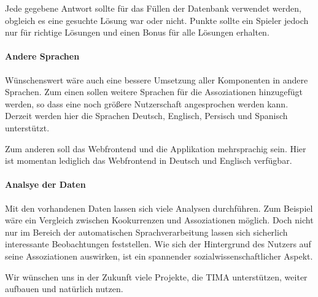 Jede gegebene Antwort sollte für das Füllen der Datenbank verwendet werden, obgleich
es eine gesuchte Lösung war oder nicht. Punkte sollte ein Spieler jedoch nur
für richtige Lösungen und einen Bonus für alle Lösungen erhalten.

\paragraph{Andere Sprachen}
Wünschenswert wäre auch eine bessere Umsetzung aller Komponenten in andere Sprachen.
Zum einen sollen weitere Sprachen für die Assoziationen hinzugefügt werden, so dass eine noch größere Nutzerschaft angesprochen werden kann. Derzeit werden hier die Sprachen Deutsch, Englisch, Persisch und Spanisch unterstützt.

Zum anderen soll das Webfrontend und die Applikation mehrsprachig sein. Hier ist momentan lediglich das Webfrontend in Deutsch und Englisch verfügbar.

\paragraph{Analsye der Daten}
Mit den vorhandenen Daten lassen sich viele Analysen durchführen. Zum Beispiel wäre ein Vergleich zwischen Kookurrenzen und Assoziationen möglich. Doch nicht nur im Bereich der automatischen Sprachverarbeitung lassen sich sicherlich interessante Beobachtungen feststellen. Wie sich der Hintergrund des Nutzers auf seine Assoziationen auswirken, ist ein spannender sozialwissenschaftlicher Aspekt.

Wir wünschen uns in der Zukunft viele Projekte, die TIMA unterstützen, weiter aufbauen und natürlich nutzen.

